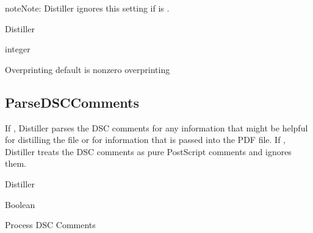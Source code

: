 \documentclass[letterpaper,12pt,english,openany,oneside]{sphinxmanual}
\begin{document}
\begin{sphinxadmonition}{note}{Note:}
Distiller ignores this setting if  is  .
\end{sphinxadmonition}
\label{\detokenize{PDF_Create_CommonSettings:supported-by-98}}

Distiller

\label{\detokenize{PDF_Create_CommonSettings:type-97}}

integer

\label{\detokenize{PDF_Create_CommonSettings:ui-name-80}}

Overprinting default is nonzero overprinting

\label{\detokenize{PDF_Create_CommonSettings:default-value-92}}

\begin{sphinxVerbatim}[commandchars=\\\{\}]
\end{sphinxVerbatim}




\subsection{ParseDSCComments}
\label{\detokenize{PDF_Create_CommonSettings:parsedsccomments}}
If  , Distiller parses the DSC comments for any information that might be helpful for distilling the file or for information that is passed into the PDF file. If  , Distiller treats the DSC comments as pure PostScript comments and ignores them.

\label{\detokenize{PDF_Create_CommonSettings:supported-by-99}}

Distiller

\label{\detokenize{PDF_Create_CommonSettings:type-98}}

Boolean

\label{\detokenize{PDF_Create_CommonSettings:ui-name-81}}

Process DSC Comments

\label{\detokenize{PDF_Create_CommonSettings:default-value-93}}
\end{document}
